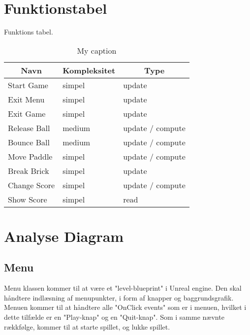 \section{Funktionstabel}
Funktions tabel.
\begin{table}[]
\centering
\caption{My caption}
\label{my-label}
\begin{tabular}{lll}
\multicolumn{1}{c}{Navn}          & \multicolumn{1}{c}{Kompleksitet} & \multicolumn{1}{c}{Type} \\ \hline
\multicolumn{1}{l|}{Start Game}   & \multicolumn{1}{l|}{simpel}      & update                   \\
\multicolumn{1}{l|}{Exit Menu}    & \multicolumn{1}{l|}{simpel}      & update                   \\
\multicolumn{1}{l|}{Exit Game}    & \multicolumn{1}{l|}{simpel}      & update                   \\
\multicolumn{1}{l|}{Release Ball} & \multicolumn{1}{l|}{medium}      & update / compute         \\
\multicolumn{1}{l|}{Bounce Ball}  & \multicolumn{1}{l|}{medium}      & update / compute         \\
\multicolumn{1}{l|}{Move Paddle}  & \multicolumn{1}{l|}{simpel}      & update / compute         \\
\multicolumn{1}{l|}{Break Brick}  & \multicolumn{1}{l|}{simpel}      & update                   \\
\multicolumn{1}{l|}{Change Score} & \multicolumn{1}{l|}{simpel}      & update / compute         \\
\multicolumn{1}{l|}{Show Score}   & \multicolumn{1}{l|}{simpel}      & read                    
\end{tabular}
\end{table}

\section{Analyse Diagram}

\subsection{Menu}
Menu klassen kommer til at være et "level-blueprint" i Unreal engine. Den skal håndtere indlæsning af menupunkter, i form af
knapper og baggrundsgrafik. Menuen kommer til at håndtere alle "OnClick events" som er i menuen, hvilket i dette tilfælde er en
"Play-knap" og en "Quit-knap". Som i samme nævnte rækkfølge, kommer til at starte spillet, og lukke spillet.

